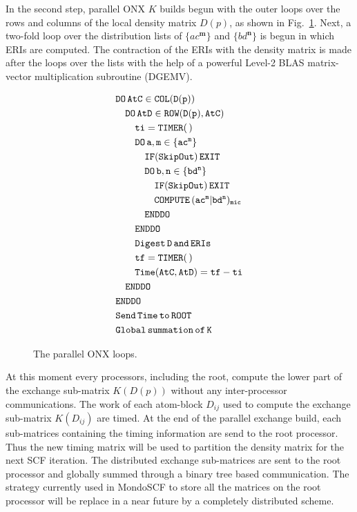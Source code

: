 \documentclass[twocolumn,showkeys,showpacs,preprintnumbers,amsmath,amssymb]{revtex4}
\begin{document}
In the second step, parallel ONX $K$ builds begun with the outer loops over
the rows and columns of the local density matrix $D(p)$, 
as shown in Fig.~\ref{Fig:ONXcore}. Next, a two-fold loop over
the distribution lists of $\{ac^\mathbf{m}\}$ and $\{bd^\mathbf{n}\}$
is begun in which ERIs are computed. The contraction of 
the ERIs with the density matrix is made after the loops over the lists with the help of a powerful
Level-2 BLAS matrix-vector multiplication subroutine (DGEMV).

\begin{figure}[htbp]
  \centering
  \caption{\protect
    The parallel ONX loops. 
  }\label{Fig:ONXcore}
  \begin{equation*}
    \begin{split}
      &\tt        DO\,AtC\in COL(D(p)) \\
      &\tt\quad     DO\,AtD\in ROW(D(p),AtC) \\
      &\tt\qquad      ti=TIMER(\,) \\
      &\tt\qquad      DO\,a,m\in\{ac^m\} \\
      &\tt\qquad\quad   IF(SkipOut)\,EXIT  \\
      &\tt\qquad\quad   DO\,b,n\in\{bd^n\} \\
      &\tt\qquad\qquad    IF(SkipOut)\,EXIT  \\
      &\tt\qquad\qquad    COMPUTE\,(ac^m|bd^n)_{mic} \\
      &\tt\qquad\quad   ENDDO \\
      &\tt\qquad      ENDDO \\
      &\tt\qquad      Digest\,D\,and\,ERIs \\
      &\tt\qquad      tf=TIMER(\,) \\
      &\tt\qquad      Time(AtC,AtD)=tf-ti \\
      &\tt\quad     ENDDO \\
      &\tt         ENDDO \\
      &\tt         Send\,Time\,to\,ROOT \\
      &\tt         Global\,summation\,of\,K 
    \end{split}
  \end{equation*}
\end{figure}

 At this moment every processors, including the root, compute 
 the lower part of the exchange sub-matrix $K(D(p))$ 
 without any inter-processor communications. 
 The work of each atom-block
 $D_{ij}$ used to compute the exchange 
 sub-matrix $K(D_{ij})$ are timed.
 At the end of the parallel exchange build, each sub-matrices containing 
 the timing information are send to the root processor.
 Thus the new timing matrix will be used to partition the density 
 matrix for the next SCF iteration.
 The distributed exchange sub-matrices are sent to the root processor and globally 
 summed through a binary tree based communication.
 The strategy currently used in MondoSCF to store all the matrices on 
 the root processor will be replace in a near future
 by a completely distributed scheme.
 
\end{document}
